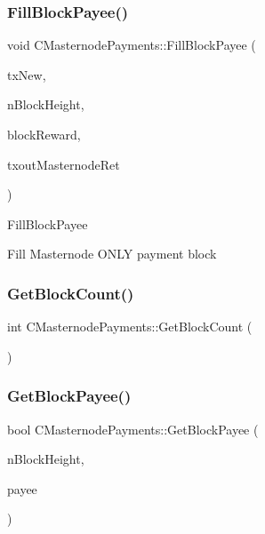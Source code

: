 \subsubsection{\texorpdfstring{Fill\+Block\+Payee()}{FillBlockPayee()}}
{\footnotesize\ttfamily void C\+Masternode\+Payments\+::\+Fill\+Block\+Payee (\begin{DoxyParamCaption}\item[{C\+Mutable\+Transaction \&}]{tx\+New,  }\item[{int}]{n\+Block\+Height,  }\item[{\mbox{\hyperlink{amount_8h_a4eaf3a5239714d8c45b851527f7cb564}{C\+Amount}}}]{block\+Reward,  }\item[{C\+Tx\+Out \&}]{txout\+Masternode\+Ret }\end{DoxyParamCaption})}

Fill\+Block\+Payee

Fill Masternode O\+N\+LY payment block \mbox{\label{class_c_masternode_payments_ab7679d3a59bcccefe00eeff3e18a8e77}} 
\subsubsection{\texorpdfstring{Get\+Block\+Count()}{GetBlockCount()}}
{\footnotesize\ttfamily int C\+Masternode\+Payments\+::\+Get\+Block\+Count (\begin{DoxyParamCaption}{ }\end{DoxyParamCaption})\hspace{0.3cm}{\ttfamily [inline]}}

\mbox{\label{class_c_masternode_payments_a23ced53f72a503a71bbe6be8d472ecfd}} 
\subsubsection{\texorpdfstring{Get\+Block\+Payee()}{GetBlockPayee()}}
{\footnotesize\ttfamily bool C\+Masternode\+Payments\+::\+Get\+Block\+Payee (\begin{DoxyParamCaption}\item[{int}]{n\+Block\+Height,  }\item[{C\+Script \&}]{payee }\end{DoxyParamCaption})}

